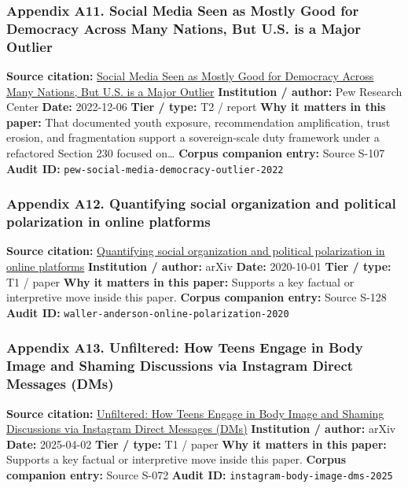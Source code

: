 \documentclass[
  american,
  11pt,
  letterpaper,
]{article}
\begin{document}
\subsubsection{Appendix A11. Social Media Seen as Mostly Good for
Democracy Across Many Nations, But U.S. is a Major
Outlier}\label{ch-10-appendix-a11-social-media-seen-as-mostly-good-for-democracy-across-many-nations-but-u-s-is-a-major-outlier}

\textbf{Source citation:}
\href{https://www.pewresearch.org/global/2022/12/06/social-media-seen-as-mostly-good-for-democracy-across-many-nations-but-u-s-is-a-major-outlier/}{Social
Media Seen as Mostly Good for Democracy Across Many Nations, But U.S. is
a Major Outlier} \textbf{Institution / author:} Pew Research Center
\textbf{Date:} 2022-12-06 \textbf{Tier / type:} T2 / report \textbf{Why
it matters in this paper:} That documented youth exposure,
recommendation amplification, trust erosion, and fragmentation support a
sovereign-scale duty framework under a refactored Section 230 focused
on\ldots{} \textbf{Corpus companion entry:} Source S-107 \textbf{Audit
ID:} \texttt{pew-social-media-democracy-outlier-2022}

\subsubsection{Appendix A12. Quantifying social organization and
political polarization in online
platforms}\label{ch-10-appendix-a12-quantifying-social-organization-and-political-polarization-in-online-platforms}

\textbf{Source citation:}
\href{https://arxiv.org/abs/2010.00590}{Quantifying social organization
and political polarization in online platforms} \textbf{Institution /
author:} arXiv \textbf{Date:} 2020-10-01 \textbf{Tier / type:} T1 /
paper \textbf{Why it matters in this paper:} Supports a key factual or
interpretive move inside this paper. \textbf{Corpus companion entry:}
Source S-128 \textbf{Audit ID:}
\texttt{waller-anderson-online-polarization-2020}

\subsubsection{Appendix A13. Unfiltered: How Teens Engage in Body Image
and Shaming Discussions via Instagram Direct Messages
(DMs)}\label{ch-10-appendix-a13-unfiltered-how-teens-engage-in-body-image-and-shaming-discussions-via-instagram-direct-messages-dms}

\textbf{Source citation:}
\href{https://arxiv.org/abs/2504.02176}{Unfiltered: How Teens Engage in
Body Image and Shaming Discussions via Instagram Direct Messages (DMs)}
\textbf{Institution / author:} arXiv \textbf{Date:} 2025-04-02
\textbf{Tier / type:} T1 / paper \textbf{Why it matters in this paper:}
Supports a key factual or interpretive move inside this paper.
\textbf{Corpus companion entry:} Source S-072 \textbf{Audit ID:}
\texttt{instagram-body-image-dms-2025}
\end{document}
